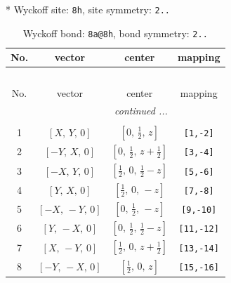 \documentclass[fleqn,8pt]{jsarticle}
\begin{document}
* Wyckoff site: {\tt 8h}, site symmetry: {\tt 2..}
\renewcommand{\arraystretch}{1.2}
\begin{longtable}{cccc}
\caption{Wyckoff bond: {\tt 8a@8h}, bond symmetry: {\tt 2..}}
 \\
 \hline \hline
No. & vector & center & mapping \\ \hline \endfirsthead

\multicolumn{3}{l}{\tablename\ \thetable{}} \\
 \hline \hline
No. & vector & center & mapping \\ \hline \endhead

 \hline \hline
\multicolumn{3}{r}{\footnotesize\it continued ...} \\ \endfoot

 \hline \hline
\multicolumn{3}{r}{} \\ \endlastfoot

1 & $\left[ X,\, Y,\, 0 \right]$ & $\left[ 0,\, \frac{1}{2},\, z \right]$ & {\tt [1,-2]} \\ \hline
2 & $\left[ - Y,\, X,\, 0 \right]$ & $\left[ 0,\, \frac{1}{2},\, z + \frac{1}{2} \right]$ & {\tt [3,-4]} \\ \hline
3 & $\left[ - X,\, Y,\, 0 \right]$ & $\left[ \frac{1}{2},\, 0,\, \frac{1}{2} - z \right]$ & {\tt [5,-6]} \\ \hline
4 & $\left[ Y,\, X,\, 0 \right]$ & $\left[ \frac{1}{2},\, 0,\, - z \right]$ & {\tt [7,-8]} \\ \hline
5 & $\left[ - X,\, - Y,\, 0 \right]$ & $\left[ 0,\, \frac{1}{2},\, - z \right]$ & {\tt [9,-10]} \\ \hline
6 & $\left[ Y,\, - X,\, 0 \right]$ & $\left[ 0,\, \frac{1}{2},\, \frac{1}{2} - z \right]$ & {\tt [11,-12]} \\ \hline
7 & $\left[ X,\, - Y,\, 0 \right]$ & $\left[ \frac{1}{2},\, 0,\, z + \frac{1}{2} \right]$ & {\tt [13,-14]} \\ \hline
8 & $\left[ - Y,\, - X,\, 0 \right]$ & $\left[ \frac{1}{2},\, 0,\, z \right]$ & {\tt [15,-16]} \\
\end{longtable}
\renewcommand{\arraystretch}{1.2}
\end{document}

